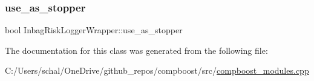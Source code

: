 \mbox{\label{class_inbag_risk_logger_wrapper_aca25b80855d0f8dcf9b59a4d544ecca8}} 
\subsubsection{\texorpdfstring{use\+\_\+as\+\_\+stopper}{use\_as\_stopper}}
{\footnotesize\ttfamily bool Inbag\+Risk\+Logger\+Wrapper\+::use\+\_\+as\+\_\+stopper\hspace{0.3cm}{\ttfamily [private]}}



The documentation for this class was generated from the following file\+:\begin{DoxyCompactItemize}
\item 
C\+:/\+Users/schal/\+One\+Drive/github\+\_\+repos/compboost/src/\mbox{\hyperlink{compboost__modules_8cpp}{compboost\+\_\+modules.\+cpp}}\end{DoxyCompactItemize}
